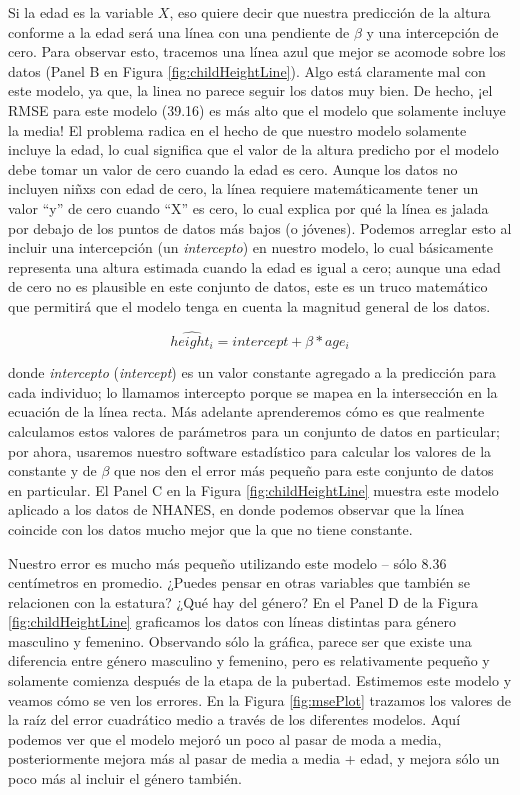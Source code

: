 \documentclass[
  12pt,
]{book}
\theoremstyle{definition}
\theoremstyle{definition}
\theoremstyle{definition}
\theoremstyle{remark}
\begin{document}
Si la edad es la variable \(X\), eso quiere decir que nuestra predicción de la altura conforme a la edad será una línea con una pendiente de \(\beta\) y una intercepción de cero. Para observar esto, tracemos una línea azul que mejor se acomode sobre los datos (Panel B en Figura \ref{fig:childHeightLine}). Algo está claramente mal con este modelo, ya que, la linea no parece seguir los datos muy bien. De hecho, ¡el RMSE para este modelo (39.16) es más alto que el modelo que solamente incluye la media! El problema radica en el hecho de que nuestro modelo solamente incluye la edad, lo cual significa que el valor de la altura predicho por el modelo debe tomar un valor de cero cuando la edad es cero. Aunque los datos no incluyen niñxs con edad de cero, la línea requiere matemáticamente tener un valor ``y'' de cero cuando ``X'' es cero, lo cual explica por qué la línea es jalada por debajo de los puntos de datos más bajos (o jóvenes). Podemos arreglar esto al incluir una intercepción (un \emph{intercepto}) en nuestro modelo, lo cual básicamente representa una altura estimada cuando la edad es igual a cero; aunque una edad de cero no es plausible en este conjunto de datos, este es un truco matemático que permitirá que el modelo tenga en cuenta la magnitud general de los datos.

\[
\hat{height_i} = intercept + \beta * age_i
\]

donde \emph{intercepto} (\emph{intercept}) es un valor constante agregado a la predicción para cada individuo; lo llamamos intercepto porque se mapea en la intersección en la ecuación de la línea recta. Más adelante aprenderemos cómo es que realmente calculamos estos valores de parámetros para un conjunto de datos en particular; por ahora, usaremos nuestro software estadístico para calcular los valores de la constante y de \(\beta\) que nos den el error más pequeño para este conjunto de datos en particular. El Panel C en la Figura \ref{fig:childHeightLine} muestra este modelo aplicado a los datos de NHANES, en donde podemos observar que la línea coincide con los datos mucho mejor que la que no tiene constante.

Nuestro error es mucho más pequeño utilizando este modelo -- sólo 8.36 centímetros en promedio. ¿Puedes pensar en otras variables que también se relacionen con la estatura? ¿Qué hay del género? En el Panel D de la Figura \ref{fig:childHeightLine} graficamos los datos con líneas distintas para género masculino y femenino. Observando sólo la gráfica, parece ser que existe una diferencia entre género masculino y femenino, pero es relativamente pequeño y solamente comienza después de la etapa de la pubertad. Estimemos este modelo y veamos cómo se ven los errores. En la Figura \ref{fig:msePlot} trazamos los valores de la raíz del error cuadrático medio a través de los diferentes modelos. Aquí podemos ver que el modelo mejoró un poco al pasar de moda a media, posteriormente mejora más al pasar de media a media + edad, y mejora sólo un poco más al incluir el género también.
\end{document}

